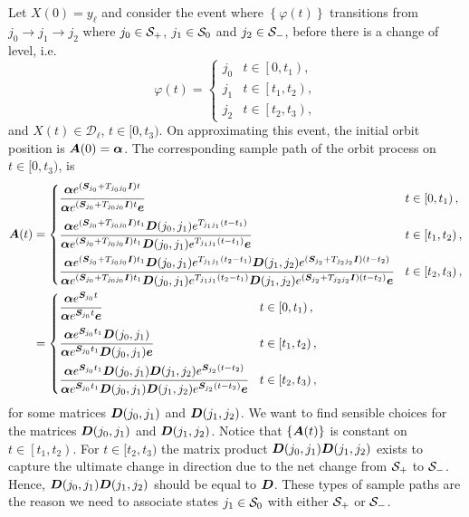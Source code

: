 Let \(X(0)=y_\ell\) and consider the event where \(\left\{\varphi(t)\right\}\) transitions from \(j_0\to j_1\to j_2\) where \(j_0\in\mathcal{S}_+\), \(j_1\in\mathcal{S}_0\) and \(j_2\in\mathcal{S}_-\), before there is a change of level, i.e. 
\[\varphi(t) = \begin{cases}
	j_0 & t\in\left[0,t_1\right), \\
	j_1 & t\in\left[t_1,t_2\right), \\
	j_2 & t\in\left[t_2,t_3\right),
\end{cases}\]
and \(X(t)\in\mathcal D_\ell\), \(t\in{}[0,t_3)\). 
On approximating this event, the initial orbit position is \(\boldsymbol A(0)=\boldsymbol \alpha\). The corresponding sample path of the orbit process on \(t\in{}[0,t_3)\), is 
\begin{align*}
\bs A(t) &= \begin{cases} 
	\cfrac{\bs \alpha e^{(\bs{S}_{j_0}+T_{{j_0}{j_0}}\bs{I})t}}{\bs \alpha e^{(\bs{S}_{j_0}+T_{{j_0}{j_0}}\bs{I})t}\bs e} & t\in\left[0,t_1\right), \\[10pt]
	\cfrac{\bs \alpha e^{(\bs{S}_{j_0}+T_{{j_0}{j_0}}\bs{I})t_1}\bs{D}({j_0},{j_1})e^{T_{{j_1}{j_1}}(t-t_1)}}{\bs \alpha e^{(\bs{S}_{j_0}+T_{{j_0}{j_0}}\bs{I})t_1}\bs{D}({j_0},{j_1})e^{T_{{j_1}{j_1}}(t-t_1)}\bs e} & t\in\left[t_1,t_2\right), \\[10pt]
	\cfrac{\bs \alpha e^{(\bs{S}_{j_0}+T_{{j_0}{j_0}}\bs{I})t_1}\bs{D}({j_0},{j_1})e^{T_{{j_1}{j_1}}(t_2-t_1)}\bs{D}({j_1},{j_2})e^{(\bs{S}_{j_2}+T_{{j_2}{j_2}}\bs{I})(t-t_2)}}{\bs \alpha e^{(\bs{S}_{j_0}+T_{{j_0}{j_0}}\bs{I})t_1}\bs{D}({j_0},{j_1})e^{T_{{j_1}{j_1}}(t_2-t_1)}\bs{D}({j_1},{j_2})e^{(\bs{S}_{j_2}+T_{{j_2}{j_2}}\bs{I})(t-t_2)}\bs e} & t\in\left[t_2,t_3\right),
\end{cases}
%
\\&= \begin{cases} 
	\cfrac{\bs \alpha e^{\bs{S}_{j_0}t}}{\bs \alpha e^{\bs{S}_{{j_0}}t}\bs e} & t\in\left[0,t_1\right), \\[10pt]
	\cfrac{\bs \alpha e^{\bs{S}_{j_0}t_1}\bs{D}({j_0},{j_1})}{\bs \alpha e^{\bs{S}_{j_0}t_1}\bs{D}({j_0},{j_1})\bs e} & t\in\left[t_1,t_2\right), \\[10pt] 
	\cfrac{\bs \alpha e^{\bs{S}_{j_0}t_1}\bs{D}({j_0},{j_1})\bs{D}({j_1},{j_2})e^{\bs{S}_{j_2}(t-t_2)}}{\bs \alpha e^{\bs{S}_{j_0}t_1}\bs{D}({j_0},{j_1})\bs{D}({j_1},{j_2})e^{\bs{S}_{j_2}(t-t_2)}\bs e} & t\in\left[t_2,t_3\right),
\end{cases}
\end{align*}
for some matrices \(\boldsymbol{D}({j_0},{j_1})\) and \(\boldsymbol{D}({j_1},{j_2})\). We want to find sensible choices for the matrices \(\boldsymbol{D}({j_0},{j_1})\) and \(\boldsymbol{D}({j_1},{j_2})\). Notice that \(\left\{\boldsymbol A(t)\right\}\) is constant on \(t\in\left[t_1,t_2\right)\). For \(t\in[t_2,t_3)\) the matrix product \(\boldsymbol{D}({j_0},{j_1})\boldsymbol{D}({j_1},{j_2})\) exists to capture the ultimate change in direction due to the net change from \(\mathcal{S}_+\) to \(\mathcal{S}_-\). Hence, \(\boldsymbol{D}({j_0},{j_1})\boldsymbol{D}({j_1},{j_2})\) should be equal to \(\boldsymbol{D}\). These types of sample paths are the reason we need to associate states \({j_1}\in\mathcal{S}_0\) with either \(\mathcal{S}_+\) or \(\mathcal{S}_-\).

